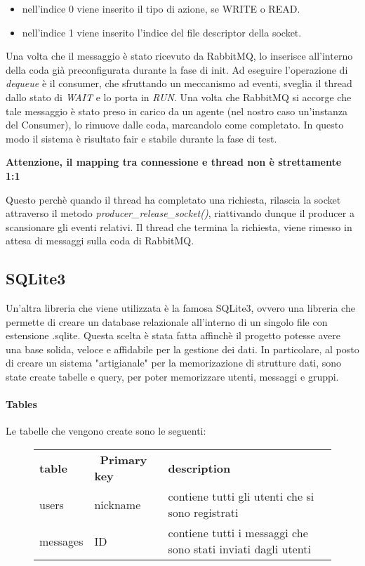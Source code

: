 \documentclass[]{article}
\begin{document}
\begin{itemize}
	\item nell'indice 0 viene inserito il tipo di azione, se WRITE o READ.
	\item nell'indice 1 viene inserito l'indice del file descriptor della socket.
\end{itemize}
Una volta che il messaggio \`e stato ricevuto da RabbitMQ, lo inserisce all'interno della coda
gi\`a preconfigurata durante la fase di init.
Ad eseguire l'operazione di \textit{dequeue} \`e il consumer, che sfruttando un meccanismo
ad eventi, sveglia il thread dallo stato di \textit{WAIT} e lo porta in \textit{RUN}.
Una volta che RabbitMQ si accorge che tale messaggio \`e  stato preso in carico da un agente (nel nostro caso un'instanza del Consumer),
lo rimuove dalle coda, marcandolo come completato.
In questo modo il sistema \`e risultato fair e stabile durante la fase di test.

\begin{center}
\textbf{	Attenzione, il mapping tra connessione e thread non \`e strettamente 1:1}
\end{center}

Questo perch\`e quando il thread ha completato una richiesta, rilascia la socket attraverso il metodo \textit{producer\_release\_socket()}, riattivando dunque il producer a scansionare gli eventi relativi. Il thread che termina la richiesta, viene rimesso in attesa di messaggi
sulla coda di RabbitMQ.

\subsection{SQLite3}
Un'altra libreria che viene utilizzata \`e la famosa SQLite3, ovvero una libreria che permette di creare un database relazionale
all'interno di un singolo file con estensione .sqlite.
Questa scelta \`e stata fatta affinch\`e il progetto potesse avere una base solida, veloce e affidabile per la gestione dei dati.
In particolare, al posto di creare un sistema "artigianale" per la memorizazione di strutture dati, sono state create
tabelle e query, per poter memorizzare utenti, messaggi e gruppi.

\paragraph{Tables}
Le tabelle che vengono create sono le seguenti:

\begin{figure}[H]
	\begin{table}[H]
		\begin{tabular}{lll}			
			\textbf{table} & \ \textbf{Primary key} & \textbf{description} \\
			users & nickname & contiene tutti gli utenti che si sono registrati \\
			messages & ID & contiene tutti i messaggi che sono stati inviati dagli utenti
		\end{tabular}
	\end{table}
\end{figure}
\end{document}
